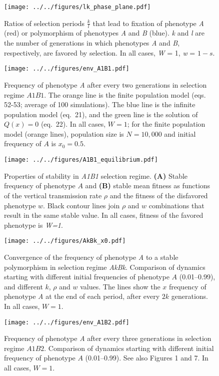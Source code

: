\documentclass[9pt, a4paper]{extarticle}
\begin{document}
\begin{figure}
\centering
\texttt{[image: ../../figures/lk\_phase\_plane.pdf]}
\caption{Ratios of selection periods \(\frac{k}{l}\) that lead to
fixation of phenotype \emph{A} (red) or polymorphism of phenotypes
\emph{A} and \emph{B} (blue). \emph{k} and \emph{l} are the number of
generations in which phenotypes \emph{A} and \emph{B}, respectively, are favored by selection.
In all cases, \emph{W} = 1, \emph{w} = \(1-s\).}\label{fig:lk_phase_plane}
\end{figure}

\begin{figure}
\centering
\texttt{[image: ../../figures/env\_A1B1.pdf]}
\caption{Frequency of phenotype \emph{A} after every two generations in
selection regime \(A1B1\). The orange line is the finite population model
(eqs. 52-53; average of 100 simulations). The blue line is the infinite population model
(eq.\ 21), and the green line is the  solution of \(Q(x)=0\) (eq.\ 22). In all cases, \(W=1\); for the finite population model (orange lines), population size is \(N=10,000\) and initial frequency of \(A\) is \(x_0=0.5\).}\label{fig:env_A1B1}
\end{figure}

\begin{figure}
\centering
\texttt{[image: ../../figures/A1B1\_equilibrium.pdf]}
\caption{Properties of stability in \emph{A1B1} selection regime.
\textbf{(A)} Stable frequency of phenotype $A$ and \textbf{(B)} stable mean fitness as functions of the vertical transmission rate \(\rho\) and the fitness of the disfavored phenotype \(w\).
Black contour lines join \(\rho\) and \(w\) combinations that result in the same stable value.
In all cases, fitness of the favored phenotype is \emph{W=1}.
}\label{fig:A1B1_equilibrium}
\end{figure}

\begin{figure}
\centering
\texttt{[image: ../../figures/AkBk\_x0.pdf]}
\caption{Convergence of the frequency of phenotype \emph{A} to a stable polymorphism in selection regime \emph{AkBk}.
Comparison of dynamics starting with different initial frequencies of phenotype \(A\) (0.01--0.99), and different $k$, $\rho$ and $w$ values.
The lines show the $x$ frequency of phenotype \emph{A} at the end of each period, after every $2k$ generations.
In all cases, $W=1$.}\label{fig:AkBk_x0}
\end{figure}

\begin{figure}
\centering
\texttt{[image: ../../figures/env\_A1B2.pdf]}
\caption{Frequency of phenotype \emph{A} after every three generations in
selection regime $A1B2$. Comparison of dynamics starting with
different initial frequency of phenotype \(A\) (0.01--0.99).
See also Figures 1 and  7. In all cases, $W=1$.}\label{fig:env_A1B2}
\end{figure}
\end{document}

